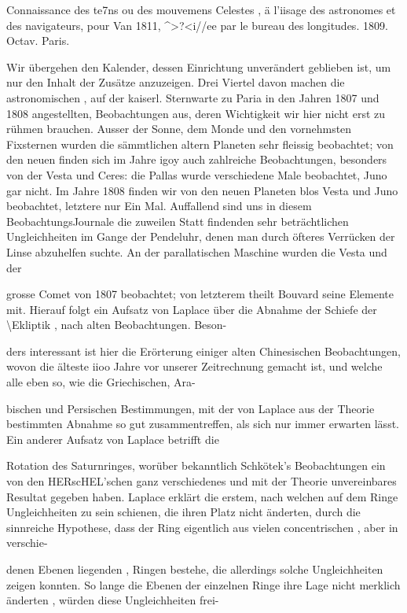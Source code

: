 \documentclass[10pt,a4paper]{article}
\begin{document}
Connaissance des te7ns ou des mouvemens Celestes , ä l'iisage des astronomes et des navigateurs, pour Van 1811, \textasciicircum{}>?<i//ee par le bureau des longitudes. 1809. Octav. Paris.

Wir übergehen den Kalender, dessen Einrichtung unverändert geblieben ist, um nur den Inhalt der Zusätze anzuzeigen. Drei Viertel davon machen die astronomischen , auf der kaiserl. Sternwarte zu Paria in den Jahren 1807 und 1808 angestellten, Beobachtungen aus, deren Wichtigkeit wir hier nicht erst zu rühmen brauchen. Ausser der Sonne, dem Monde und den vornehmsten Fixsternen wurden die sämmtlichen altern Planeten sehr fleissig beobachtet; von den neuen finden sich im Jahre igoy auch zahlreiche Beobachtungen, besonders von der Vesta und Ceres: die Pallas wurde verschiedene Male beobachtet, Juno gar nicht. Im Jahre 1808 finden wir von den neuen Planeten blos Vesta und Juno beobachtet, letztere nur Ein Mal. Auffallend sind uns in diesem BeobachtungsJournale die zuweilen Statt findenden sehr beträchtlichen Ungleichheiten im Gange der Pendeluhr, denen man durch öfteres Verrücken der Linse abzuhelfen suchte. An der parallatischen Maschine wurden die Vesta und der

grosse Comet von 1807 beobachtet; von letzterem theilt Bouvard seine Elemente mit. Hierauf folgt ein Aufsatz von Laplace über die Abnahme der Schiefe der \textbackslash{}Ekliptik , nach alten Beobachtungen. Beson-

ders interessant ist hier die Erörterung einiger alten Chinesischen Beobachtungen, wovon die älteste iioo Jahre vor unserer Zeitrechnung gemacht ist, und welche alle eben so, wie die Griechischen, Ara-

bischen und Persischen Bestimmungen, mit der von Laplace aus der Theorie bestimmten Abnahme so gut zusammentreffen, als sich nur immer erwarten lässt. Ein anderer Aufsatz von Laplace betrifft die

Rotation des Saturnringes, worüber bekanntlich Schkötek's Beobachtungen ein von den HERscHEL'schen ganz verschiedenes und mit der Theorie unvereinbares Resultat gegeben haben. Laplace erklärt die erstem, nach welchen auf dem Ringe Ungleichheiten zu sein schienen, die ihren Platz nicht änderten, durch die sinnreiche Hypothese, dass der Ring eigentlich aus vielen concentrischen , aber in verschie-

denen Ebenen liegenden , Ringen bestehe, die allerdings solche Ungleichheiten zeigen konnten. So lange die Ebenen der einzelnen Ringe ihre Lage nicht merklich änderten , würden diese Ungleichheiten frei-
\end{document}
